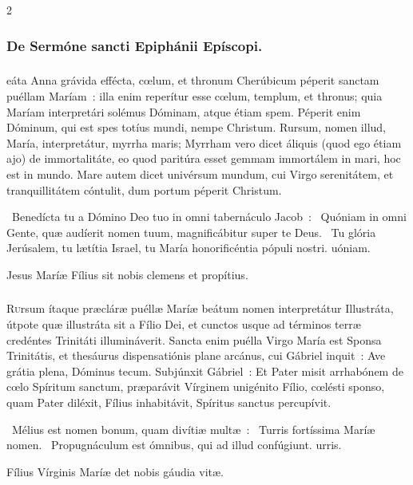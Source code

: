 \documentclass[9pt,twoside]{extarticle}
\begin{document}
\begin{multicols}{2}
\subsubsection*{\center De Sermóne sancti Epiphánii Epíscopi.}
\subsubsection*{\center {}}
eáta Anna grávida effécta, cœlum, et thronum Cherúbicum péperit sanctam puéllam Maríam~: illa enim reperítur esse cœlum, templum, et thronus; quia Maríam interpretári solémus Dóminam, atque étiam spem. Péperit enim Dóminum, qui est spes totíus mundi, nempe Christum. Rursum, nomen illud, María, interpretátur, myrrha maris; Myrrham vero dicet áliquis (quod ego étiam ajo) de immortalitáte, eo quod paritúra esset gemmam immortálem in mari, hoc est in mundo. Mare autem dicet univérsum mundum, cui Virgo serenitátem, et tranquillitátem cóntulit, dum portum péperit Christum.

\begin{tightlist}{}
\item {}~Benedícta tu a Dómino Deo tuo in omni tabernáculo Jacob~: \textred{*}~Quóniam in omni Gente, quæ audíerit nomen tuum, magnificábitur super te Deus. ~Tu glória Jerúsalem, tu lætítia Israel, tu María honorificéntia pópuli nostri. uóniam.
\item {\small {} Jesus Maríæ Fílius sit nobis clemens et propítius.}
\end{tightlist}

\subsubsection*{\center {}}
\lettrine{R}ursum ítaque præcláræ puéllæ Maríæ beátum nomen interpretátur Illustráta, útpote quæ illustráta sit a Fílio Dei, et cunctos usque ad términos terræ credéntes Trinitáti illumináverit. Sancta enim puélla Virgo María est Sponsa Trinitátis, et thesáurus dispensatiónis plane arcánus, cui Gábriel inquit~: Ave grátia plena, Dóminus tecum. Subjúnxit Gábriel~: Et Pater misit arrhabónem de cœlo Spíritum sanctum, præparávit Vírginem unigénito Fílio, cœlésti sponso, quam Pater diléxit, Fílius inhabitávit, Spíritus sanctus percupívit.

\begin{tightlist}{}
\item {}~Mélius est nomen bonum, quam divítiæ multæ~: \textred{*}~Turris fortíssima Maríæ nomen. ~Propugnáculum est ómnibus, qui ad illud confúgiunt. urris.
\item {\small {} Fílius Vírginis Maríæ det nobis gáudia vitæ.}
\end{tightlist}


\end{multicols}
\end{document}
